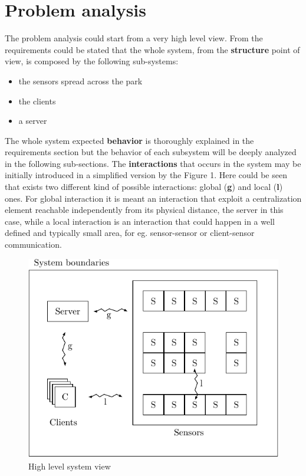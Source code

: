 \documentclass[11pt]{article}
\begin{document}
\section{Problem analysis}
The problem analysis could start from a very high level view. From the requirements could be stated that the whole system, from the \textbf{structure} point of view, is composed by the following sub-systems:
\begin{itemize}
\item the sensors spread across the park
\item the clients
\item a server
\end{itemize}
The whole system expected \textbf{behavior} is thoroughly explained in the requirements section but the behavior of each subsystem will be deeply analyzed in the following sub-sections. The \textbf{interactions} that occurs in the system may be initially introduced in a simplified version by the Figure 1. Here could be seen that exists two different kind of possible interactions: global (\textbf{g}) and local (\textbf{l}) ones. For global interaction it is meant an interaction that exploit a centralization element reachable independently from its physical distance, the server in this case, while a local interaction is an interaction that could happen in a well defined and typically small area, for eg. sensor-sensor or client-sensor communication.  

\begin{figure}
  \centering
	\includegraphics[scale=1]{system}
  \caption{High level system view}
\end{figure}
\end{document}
